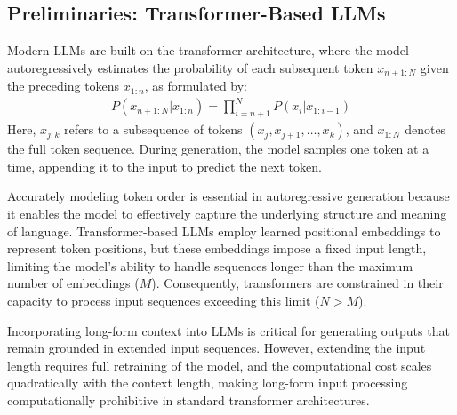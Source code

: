 \subsection{Preliminaries: Transformer-Based LLMs}
Modern LLMs are built on the transformer architecture, where the model autoregressively estimates the probability of each subsequent token $x_{n+1:N}$ given the preceding tokens $x_{1:n}$, as formulated by:
\begin{align}
    P(x_{n+1:N}|x_{1:n})=\prod_{i=n+1}^{N} P(x_{i}|x_{1:i-1})
\end{align}
Here, $x_{j:k}$ refers to a subsequence of tokens $(x_j, x_{j+1}, \dots, x_{k})$, and $x_{1:N}$ denotes the full token sequence. During generation, the model samples one token at a time, appending it to the input to predict the next token.

Accurately modeling token order is essential in autoregressive generation because it enables the model to effectively capture the underlying structure and meaning of language. Transformer-based LLMs employ learned positional embeddings to represent token positions, but these embeddings impose a fixed input length, limiting the model’s ability to handle sequences longer than the maximum number of embeddings ($M$). Consequently, transformers are constrained in their capacity to process input sequences exceeding this limit ($N > M$).

Incorporating long-form context into LLMs is critical for generating outputs that remain grounded in extended input sequences. However, extending the input length requires full retraining of the model, and the computational cost scales quadratically with the context length, making long-form input processing computationally prohibitive in standard transformer architectures.








